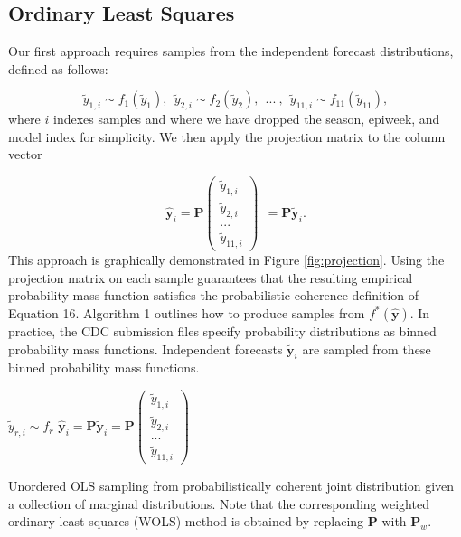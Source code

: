 \documentclass{umassthesis}          %
\begin{document}
\subsection{ Ordinary Least Squares}

Our first approach requires samples from the independent forecast distributions, defined as follows:

\begin{equation}
\tilde{y}_{1,i} \sim f_1(\tilde{y}_1), \  \ \tilde{y}_{2,i} \sim f_2(\tilde{y}_2), \  \ ... \ , \ \ \tilde{y}_{11,i} \sim f_{11}(\tilde{y}_{11}),
\end{equation}where $i$ indexes samples and where we have dropped the season, epiweek, and model index for simplicity. We then apply the projection matrix to the column vector

\begin{equation}
\bm{\hat{y}}_i=\bm{P} \begin{pmatrix} \tilde{y}_{1,i} \\ \tilde{y}_{2,i} \\ ... \\ \tilde{y}_{11,i} \end{pmatrix} \ \ = \bm{P}\bm{\tilde{y}}_i.
\end{equation}This approach is graphically demonstrated in Figure \ref{fig:projection}. Using the projection matrix on each sample guarantees that the resulting empirical probability mass function satisfies the probabilistic coherence definition of Equation 16. Algorithm 1 outlines how to produce samples from $f^*(\hat{\bm{y}})$. In practice, the CDC submission files specify probability distributions as binned probability mass functions. Independent forecasts $\boldsymbol{\tilde{y}}_i$ are sampled from these binned probability mass functions.

\begin{center}
\begin{algorithm}
    \begin{algorithmic}[1]
\State $\tilde{y}_{r,i} \sim f_r$
\EndFor
\EndFor
{}
\State $\hat{\bm{y}}_{i} = \bm{P} \tilde{\bm{y}}_{i} = \bm{P} \begin{pmatrix} \tilde{y}_{1,i} \\ \tilde{y}_{2,i} \\ ... \\ \tilde{y}_{11,i}  \end{pmatrix}$
\EndFor

    \end{algorithmic}
    \label{alg:rAP}
    \caption{Unordered OLS sampling from probabilistically coherent joint distribution given a collection of marginal distributions. Note that the corresponding weighted ordinary least squares (WOLS) method is obtained by replacing $\bm{P}$ with $\bm{P}_w$.}
\end{algorithm}
\end{center}
\end{document}
